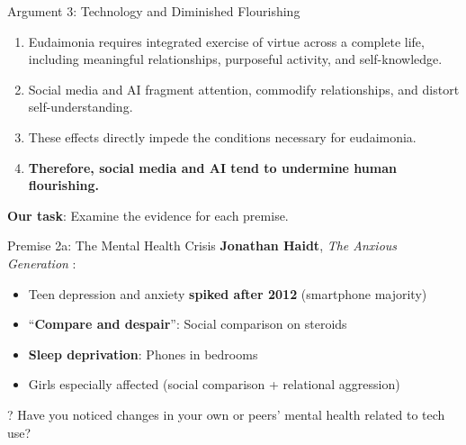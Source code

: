 \documentclass[aspectratio=169]{beamer}
\begin{document}
\begin{frame}{Argument 3: Technology and Diminished Flourishing}
\begin{argumentbox}
\begin{enumerate}
    \item Eudaimonia requires integrated exercise of virtue across a complete life, including meaningful relationships, purposeful activity, and self-knowledge.
    \item Social media and AI fragment attention, commodify relationships, and distort self-understanding.
    \item These effects directly impede the conditions necessary for eudaimonia.
    \item[\textbf{C.}] \textbf{Therefore, social media and AI tend to undermine human flourishing.}
\end{enumerate}
\end{argumentbox}

\vspace{0.3cm}
\textbf{Our task}: Examine the evidence for each premise.
\end{frame}

\begin{frame}{Premise 2a: The Mental Health Crisis}
\textbf{Jonathan Haidt}, \textit{The Anxious Generation} \parencite{haidt_anxious_generation}:

\begin{itemize}
    \item Teen depression and anxiety \textbf{spiked after 2012} (smartphone majority)
    \item ``\textbf{Compare and despair}'': Social comparison on steroids
    \item \textbf{Sleep deprivation}: Phones in bedrooms
    \item Girls especially affected (social comparison + relational aggression)
\end{itemize}

\vspace{0.1cm}
\begin{center}
\end{center}

\begin{alertblock}{?}
Have you noticed changes in your own or peers' mental health related to tech use?
\end{alertblock}
\end{frame}
\end{document}
